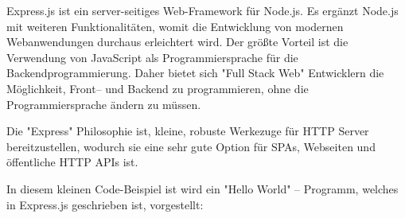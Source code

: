 
Express.js ist ein server-seitiges Web-Framework für Node.js. Es ergänzt Node.js mit weiteren Funktionalitäten, womit die Entwicklung von modernen Webanwendungen durchaus erleichtert wird. Der größte Vorteil ist die Verwendung von JavaScript als Programmiersprache für die Backendprogrammierung. Daher bietet sich "Full Stack Web" Entwicklern die Möglichkeit, Front– und Backend zu programmieren, ohne die Programmiersprache ändern zu müssen. 


Die "Express" Philosophie ist, kleine, robuste Werkezuge für HTTP Server bereitzustellen, wodurch sie eine sehr gute Option für SPAs, Webseiten und öffentliche HTTP APIs ist. \cite{Express}


In diesem kleinen Code-Beispiel ist wird ein "Hello World" – Programm, welches in Express.js geschrieben ist, vorgestellt:


\cite{Express}

